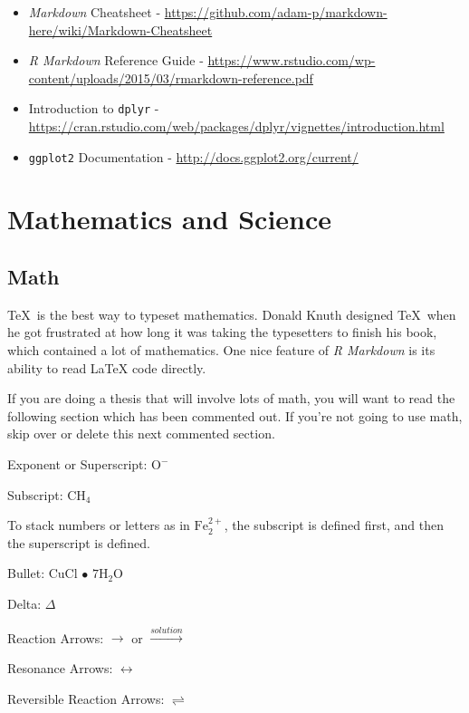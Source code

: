 \documentclass[print]{nuthesis}
\begin{document}
\begin{itemize}
\item
  \emph{Markdown} Cheatsheet - \url{https://github.com/adam-p/markdown-here/wiki/Markdown-Cheatsheet}
\item
  \emph{R Markdown} Reference Guide - \url{https://www.rstudio.com/wp-content/uploads/2015/03/rmarkdown-reference.pdf}
\item
  Introduction to \texttt{dplyr} - \url{https://cran.rstudio.com/web/packages/dplyr/vignettes/introduction.html}
\item
  \texttt{ggplot2} Documentation - \url{http://docs.ggplot2.org/current/}
\end{itemize}

\hypertarget{math-sci}{%
\chapter{Mathematics and Science}\label{math-sci}}

\hypertarget{math}{%
\section{Math}\label{math}}

\TeX~is the best way to typeset mathematics. Donald Knuth designed \TeX~when he got frustrated at how long it was taking the typesetters to finish his book, which contained a lot of mathematics. One nice feature of \emph{R Markdown} is its ability to read LaTeX code directly.

If you are doing a thesis that will involve lots of math, you will want to read the following section which has been commented out. If you're not going to use math, skip over or delete this next commented section.

\noindent Exponent or Superscript: \(\mathrm{O^-}\)

\noindent Subscript: \(\mathrm{CH_4}\)

To stack numbers or letters as in \(\mathrm{Fe_2^{2+}}\), the subscript is defined first, and then the superscript is defined.

\noindent Bullet: CuCl \(\bullet\) \(\mathrm{7H_{2}O}\)

\noindent Delta: \(\Delta\)

\noindent Reaction Arrows: \(\longrightarrow\) or \(\xrightarrow{solution}\)

\noindent Resonance Arrows: \(\leftrightarrow\)

\noindent Reversible Reaction Arrows: \(\rightleftharpoons\)
\end{document}
